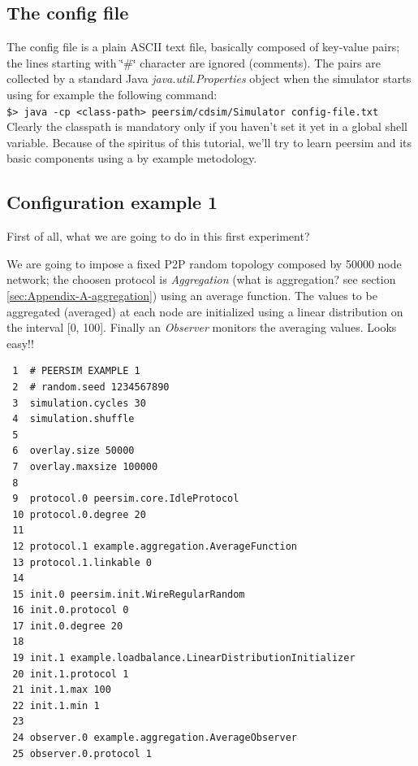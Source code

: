\documentclass[a4paper,12pt]{article}
\begin{document}
\subsection{The config file}
\label{configfile}

The config file is a plain ASCII text file, basically composed of
key-value pairs; the lines starting with \char`\"{}\#\char`\"{} character
are ignored (comments). The pairs are collected by a standard Java
\emph{java.util.Properties} object when the simulator starts using
for example the following command:\\


\texttt{\footnotesize \$> java -cp <class-path> peersim/cdsim/Simulator
config-file.txt}\\


Clearly the classpath is mandatory only if you haven't set it yet
in a global shell variable. Because of the spiritus of this tutorial,
we'll try to learn peersim and its basic components
using a by example metodology.


\subsection{Configuration example 1}

First of all, what we are going to do in this first experiment? 

We are going to impose a fixed P2P random topology composed by 50000
node network; the choosen protocol is \emph{Aggregation} (what is
aggregation? see section \ref{sec:Appendix-A-aggregation}) using
an average function. The values to be aggregated (averaged) at each
node are initialized using a linear distribution on the interval {[}0,
100{]}. Finally an \emph{Observer} monitors the averaging values.
Looks easy!!\\

\footnotesize
\begin{verbatim}
 1  # PEERSIM EXAMPLE 1
 2  # random.seed 1234567890
 3  simulation.cycles 30
 4  simulation.shuffle
 5 
 6  overlay.size 50000
 7  overlay.maxsize 100000
 8 
 9  protocol.0 peersim.core.IdleProtocol
 10 protocol.0.degree 20
 11
 12 protocol.1 example.aggregation.AverageFunction
 13 protocol.1.linkable 0
 14
 15 init.0 peersim.init.WireRegularRandom
 16 init.0.protocol 0
 17 init.0.degree 20
 18
 19 init.1 example.loadbalance.LinearDistributionInitializer
 20 init.1.protocol 1
 21 init.1.max 100
 22 init.1.min 1
 23
 24 observer.0 example.aggregation.AverageObserver
 25 observer.0.protocol 1
\end{verbatim}
\normalsize
\end{document}
